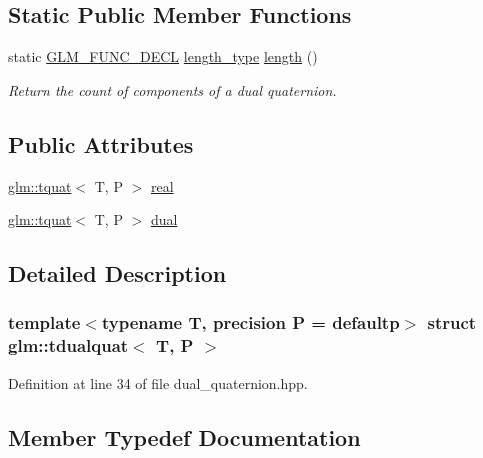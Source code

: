 \subsection*{Static Public Member Functions}
\begin{DoxyCompactItemize}
\item 
static \mbox{\hyperlink{setup_8hpp_ab2d052de21a70539923e9bcbf6e83a51}{G\+L\+M\+\_\+\+F\+U\+N\+C\+\_\+\+D\+E\+CL}} \mbox{\hyperlink{structglm_1_1tdualquat_a8100706ca94a1aa6611874787a9be0ca}{length\+\_\+type}} \mbox{\hyperlink{structglm_1_1tdualquat_a9c6d83c895e67bee1a99ab7b60d3cf1d}{length}} ()
\begin{DoxyCompactList}\small\item\em Return the count of components of a dual quaternion. \end{DoxyCompactList}\end{DoxyCompactItemize}
\subsection*{Public Attributes}
\begin{DoxyCompactItemize}
\item 
\mbox{\hyperlink{structglm_1_1tquat}{glm\+::tquat}}$<$ T, P $>$ \mbox{\hyperlink{structglm_1_1tdualquat_a402b3ac8410bd71a27f811dced8db14e}{real}}
\item 
\mbox{\hyperlink{structglm_1_1tquat}{glm\+::tquat}}$<$ T, P $>$ \mbox{\hyperlink{structglm_1_1tdualquat_abeea1eb15f230d3bc50740c3811e1fd3}{dual}}
\end{DoxyCompactItemize}


\subsection{Detailed Description}
\subsubsection*{template$<$typename T, precision P = defaultp$>$\newline
struct glm\+::tdualquat$<$ T, P $>$}



Definition at line 34 of file dual\+\_\+quaternion.\+hpp.



\subsection{Member Typedef Documentation}
\mbox{\label{structglm_1_1tdualquat_a8100706ca94a1aa6611874787a9be0ca}} 
